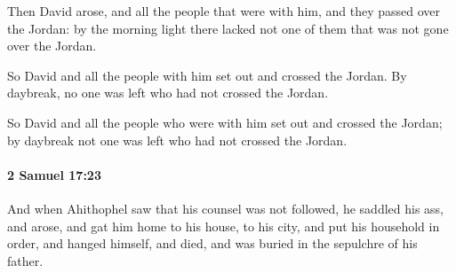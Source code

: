 			\begin{versebox}
					\item[BHS] 
					\item[ASV] Then David arose, and all the people that were with him, and they passed over the Jordan: by the morning light there lacked not one of them that was not gone over the Jordan.
					\item[NIV] So David and all the people with him set out and crossed the Jordan. By daybreak, no one was left who had not crossed the Jordan.
					\item[NRSV] So David and all the people who were with him set out and crossed the Jordan; by daybreak not one was left who had not crossed the Jordan.
			\end{versebox}

		\paragraph{2 Samuel 17:23} %
			\label{2SAMUEL-17-23}

			And when Ahithophel saw that his counsel was not followed, he saddled his ass, and arose, and gat him home to his house, to his city, and put his household in order, and hanged himself, and died, and was buried in the sepulchre of his father.

